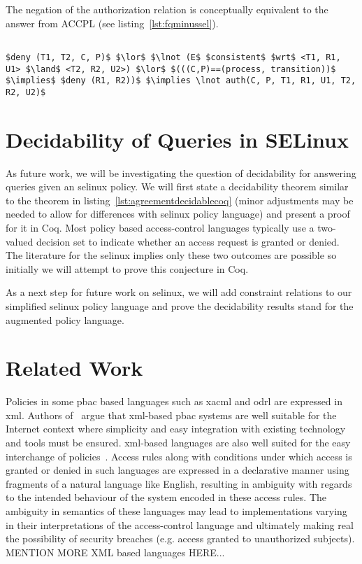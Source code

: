 The negation of the authorization relation  is conceptually equivalent to the  answer from \ac{ACCPL} (see listing~\ref{lst:fqminussel}).

\lstset{mathescape, language=AST} 
\begin{lstlisting}[frame=single, caption={\syn{NotPermitted} for \ac{selinux}},label={lst:fqminussel}]

$deny (T1, T2, C, P)$ $\lor$ $\lnot (E$ $consistent$ $wrt$ <T1, R1, U1> $\land$ <T2, R2, U2>) $\lor$ $(((C,P)==(process, transition))$ $\implies$ $deny (R1, R2))$ $\implies \lnot auth(C, P, T1, R1, U1, T2, R2, U2)$ 

\end{lstlisting}

\section{Decidability of Queries in SELinux}

As future work, we will be investigating the question of decidability for answering queries given an \ac{selinux} policy. We will first state a decidability theorem similar to the theorem in listing~\ref{lst:agreementdecidablecoq} (minor adjustments may be needed to allow for differences with \ac{selinux} policy language) and present a proof for it in Coq. Most policy based access-control languages typically use a two-valued decision set to indicate whether an access request is granted or denied. The literature for the \ac{selinux} implies only these two outcomes are possible so initially we will attempt to prove this conjecture in Coq. 

As a next step for future work on \ac{selinux}, we will add constraint relations to our simplified \ac{selinux} policy language and prove the decidability results stand for the augmented policy language.

\section{Related Work}

Policies in some \ac{pbac} based languages such as \ac{xacml} and \ac{odrl} are expressed in \ac{xml}. Authors of~\cite{ArdagnaDVS04} argue that \ac{xml}-based \ac{pbac} systems are well suitable for the Internet context where simplicity and easy integration with existing technology and tools must be ensured. \ac{xml}-based languages are also well suited for the easy interchange of policies~\cite{ArdagnaDVS04}. Access rules along with conditions under which access is granted or denied in such languages are expressed in a declarative manner using fragments of a natural language like English, resulting in ambiguity with regards to the intended behaviour of the system encoded in these access rules. The ambiguity in semantics of these languages may lead to implementations varying in their interpretations of the access-control language and ultimately making real the possibility of security breaches (e.g. access granted to unauthorized subjects). MENTION MORE XML based languages HERE...


